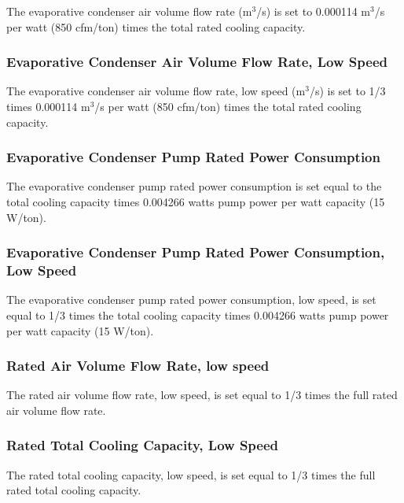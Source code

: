 The evaporative condenser air volume flow rate (m\(^{3}\)/s) is set to 0.000114 m\(^{3}\)/s per watt (850 cfm/ton) times the total rated cooling capacity.

\subsubsection{Evaporative Condenser Air Volume Flow Rate, Low Speed}\label{evaporative-condenser-air-volume-flow-rate-low-speed}

The evaporative condenser air volume flow rate, low speed (m\(^{3}\)/s) is set to 1/3 times 0.000114 m\(^{3}\)/s per watt (850 cfm/ton) times the total rated cooling capacity.

\subsubsection{Evaporative Condenser Pump Rated Power Consumption}\label{evaporative-condenser-pump-rated-power-consumption}

The evaporative condenser pump rated power consumption is set equal to the total cooling capacity times 0.004266 watts pump power per watt capacity (15 W/ton).

\subsubsection{Evaporative Condenser Pump Rated Power Consumption, Low Speed}\label{evaporative-condenser-pump-rated-power-consumption-low-speed}

The evaporative condenser pump rated power consumption, low speed, is set equal to 1/3 times the total cooling capacity times 0.004266 watts pump power per watt capacity (15 W/ton).

\subsubsection{Rated Air Volume Flow Rate, low speed}\label{rated-air-volume-flow-rate-low-speed}

The rated air volume flow rate, low speed, is set equal to 1/3 times the full rated air volume flow rate.

\subsubsection{Rated Total Cooling Capacity, Low Speed}\label{rated-total-cooling-capacity-low-speed}

The rated total cooling capacity, low speed, is set equal to 1/3 times the full rated total cooling capacity.

